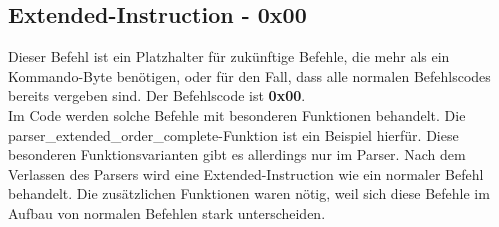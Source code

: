 \subsection{Extended-Instruction - 0x00}
Dieser Befehl ist ein Platzhalter für zukünftige Befehle, die mehr als ein Kommando-Byte benötigen,
oder für den Fall, dass alle normalen Befehlscodes bereits vergeben sind. Der Befehlscode ist \textbf{0x00}.\\
Im Code werden solche Befehle mit besonderen Funktionen behandelt. Die 
parser\_\-extended\_\-order\_\-complete-Funktion ist ein Beispiel hierfür. Diese
besonderen Funktionsvarianten gibt es allerdings nur im Parser.
Nach dem Verlassen des Parsers wird eine Extended-Instruction wie ein normaler Befehl behandelt.
Die zusätzlichen Funktionen waren nötig, weil sich diese Befehle im Aufbau von normalen Befehlen stark unterscheiden.

